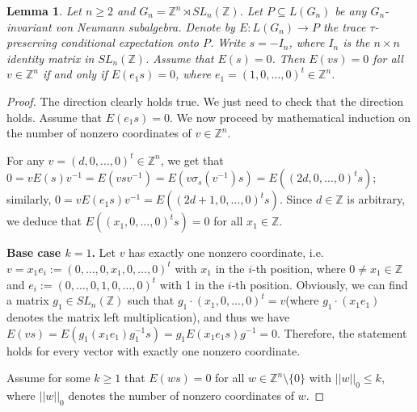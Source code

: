\documentclass[12pt]{amsart}
\newtheorem{lem}[theorem]{Lemma}
\theoremstyle{definition}
\theoremstyle{remark}
\begin{document}
\begin{lem} \label{3.6}
 Let $n\geq 2$ and $G_n=\mathbb{Z}^n\rtimes SL_n(\mathbb{Z})$. Let $P\subseteq L(G_n)$ be any $G_n$-invariant von Neumann subalgebra. Denote by $E: L(G_n)\rightarrow P$ the trace $\tau$-preserving conditional expectation onto $P$. Write $s=-I_n$, where $I_n$ is the $n\times n$ identity matrix in $SL_n(\mathbb{Z})$. Assume that $E(s)=0$. Then $E(vs)=0$ for all $v\in \mathbb{Z}^n$ if and only if $ E(e_1s)=0$, where $e_1=(1, 0,\dots,0)^t\in\mathbb{Z}^n$.   
\end{lem}
\begin{proof}
The  direction clearly holds true. We just need to check that the  direction holds. Assume that $E(e_{1}s) = 0$. We now proceed by mathematical induction on the number of nonzero coordinates of $v\in\mathbb{Z}^n$.

For any $v = (d,0,\dots,0)^t\in \mathbb{Z}^n$, we get that $0=vE(s)v^{-1}=E(vsv^{-1})=E(v\sigma_s(v^{-1})s)=E((2d, 0,\dots, 0)^ts)$; similarly, $0=vE(e_1s)v^{-1}=E((2d+1, 0,\dots, 0)^ts)$. Since $d\in\mathbb{Z}$ is arbitrary, we deduce that $E((x_{1},0,\dots,0)^t s)=0$ for all $x_{1}\in \mathbb{Z}$.

\textbf{Base case $k=1$.} Let $v$ has exactly one nonzero coordinate, i.e. $v = x_{1}e_{i}:=(0,\dots,0,x_{1},0,\dots,0)^t$ with $x_1$ in the $i$-th position, where $0\ne x_1\in \mathbb{Z}$ and $e_i:=(0,\dots,0,1,0,\dots,0)^t $ with 1 in the $i$-th position.
Obviously, we can find a matrix $g_{1}\in SL_{n}(\mathbb{Z})$ such that $g_{1}\cdot (x_1,0,\dots,0)^t = v$(where $g_{1}\cdot (x_1e_1)$ denotes the matrix left multiplication), and thus we have $E(vs) = E(g_{1}(x_1e_1)g_{1}^{-1}s) = g_{1}E(x_{1}e_1s)g^{-1} = 0$. Therefore, the statement holds for every vector with exactly one nonzero coordinate.

Assume for some $k\ge1$ that $E(ws) = 0$ for all $w\in \mathbb{Z}^n\setminus\{0\}$ with $||w||_{0}\le k$, where $||w||_{0}$ denotes the number of nonzero coordinates of $w$.


\end{proof}
\end{document}
